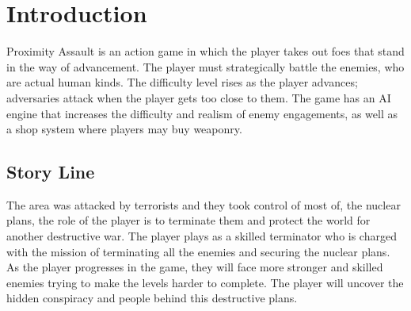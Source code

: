 
\chapter{Introduction}
Proximity Assault is an action game in which the player takes out foes that stand in the way of advancement. The player must strategically battle the enemies, who are actual human kinds. The difficulty level rises as the player advances; adversaries attack when the player gets too close to them. The game has an AI engine that increases the difficulty and realism of enemy engagements, as well as a shop system where players may buy weaponry.

\section{Story Line}
The area was attacked by terrorists and they took control of most of, the nuclear plans, the role of the player is to terminate them and protect the world for another destructive war. The player plays as a skilled terminator who is charged with the mission of terminating all the enemies and securing the nuclear plans. As the player progresses in the game, they will face more stronger and skilled enemies trying to make the levels harder to complete. The player will uncover the hidden conspiracy and people behind this destructive plans.

